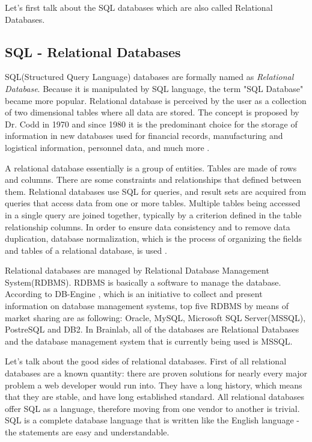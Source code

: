 \documentclass{article}
\begin{document}
Let's first talk about the SQL databases which are also called Relational Databases. 

\subsection{SQL - Relational Databases}
SQL(Structured Query Language) databases are formally named as \emph{Relational Database}. Because it is manipulated by SQL language, the term "SQL Database" became more popular. Relational database is perceived by the user as a collection of two dimensional tables where all data are stored. The concept is proposed by Dr. Codd in 1970 and since 1980 it is the predominant choice for the storage of information in new databases used for financial records, manufacturing and logistical information, personnel data, and much more \cite{online1}. 

A relational database essentially is a group of entities. Tables are made of rows and columns. There are some constraints and relationships that defined between them. Relational databases use SQL for queries, and result sets are acquired from queries that access data from one or more tables. Multiple tables being accessed in a single query are joined together, typically by a criterion defined in the table relationship columns. In order to ensure data consistency and to remove data duplication, database normalization, which is the process of organizing the fields and tables of a relational database, is used \cite{clouddb2}.  

Relational databases are managed by Relational Database Management System(RDBMS). RDBMS is basically a software to manage the database.  According to DB-Engine \cite{online2}, which is an initiative to collect and present information on database management systems, top five RDBMS by means of market sharing are as following: Oracle, MySQL, Microsoft SQL Server(MSSQL), PostreSQL and DB2. In Brainlab, all of the databases are Relational Databases and the database management system that is currently being used is MSSQL.

Let's talk about the good sides of relational databases. First of all relational databases are a known quantity: there are proven solutions for nearly every major problem a web developer would run into. They have a long history, which means that they are stable, and have long established standard. All relational databases offer SQL as a language, therefore moving from one vendor to another is trivial. SQL is a complete database language that is written like the English language - the statements are easy and understandable. 
\end{document}

